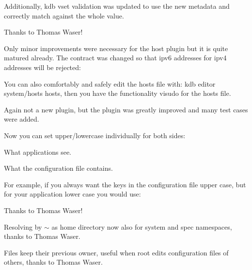 Additionally, {\ttfamily kdb vset} validation was updated to use the new metadata and correctly match against the whole value.

Thanks to Thomas Waser!

Only minor improvements were necessary for the host plugin but it is quite matured already. The contract was changed so that ipv6 addresses for ipv4 addresses will be rejected\+:


\begin{DoxyCode}{0}
\end{DoxyCode}


You can also comfortably and safely edit the hosts file with\+: {\ttfamily kdb editor system/hosts hosts}, then you have the functionality {\ttfamily visudo} for the hosts file.

Again not a new plugin, but the plugin was greatly improved and many test cases were added.

Now you can set upper/lowercase individually for both sides\+:


\begin{DoxyEnumerate}
\item What applications see.
\item What the configuration file contains.
\end{DoxyEnumerate}

For example, if you always want the keys in the configuration file upper case, but for your application lower case you would use\+:


\begin{DoxyCode}{0}
\DoxyCodeLine{\#> [SECTION]}
\end{DoxyCode}


Thanks to Thomas Waser!

Resolving by $\sim$ as home directory now also for system and spec namespaces, thanks to Thomas Waser.

Files keep their previous owner, useful when root edits configuration files of others, thanks to Thomas Waser.

